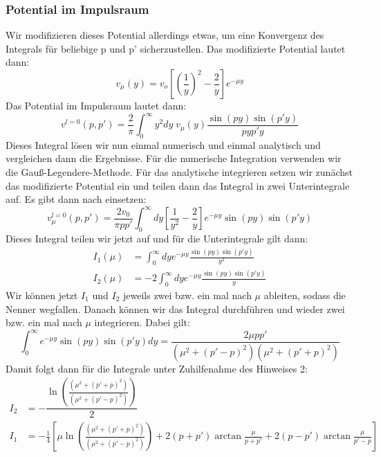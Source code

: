 \documentclass[11pt,a4paper]{article}
\begin{document}
\subsubsection*{Potential im Impulsraum}
Wir modifizieren dieses Potential allerdings etwas, um eine Konvergenz des Integrals für beliebige p und p' sicherzustellen. Das modifizierte Potential lautet dann:
\begin{equation}
	v_{\mu}(y) = v_o\left[\left(\frac{1}{y}\right)^2 -\frac{2}{y}\right]e^{-\mu y}
\end{equation}
Das Potential im Impulsraum lautet dann:
\begin{equation}\label{eq:pot_impuls}
	v^{l=0}(p,p') = \frac{2}{\pi}\int_{0}^{\infty}y^2dy\; v_{\mu}(y)\frac{\sin(py)\sin(p'y)}{pyp'y}
\end{equation}
Dieses Integral lösen wir nun einmal numerisch und einmal analytisch und vergleichen dann die Ergebnisse. Für die numerische Integration verwenden wir die Gauß-Legendere-Methode. Für das analytische integrieren setzen wir zunächst das modifizierte Potential ein und teilen dann das Integral in zwei Unterintegrale auf. Es gibt dann nach einsetzen:
\begin{equation}
	v_{\mu}^{l=0}(p,p') = \frac{2v_0}{\pi pp'}\int_{0}^{\infty}dy \left[\frac{1}{y^2}-\frac{2}{y}\right]e^{-\mu y}\sin(py)\sin(p'y)
\end{equation}
Dieses Integral teilen wir jetzt auf und für die Unterintegrale gilt dann:
\begin{align*}
	I_1(\mu) &= \int_{0}^{\infty}dye^{-\mu y}\frac{\sin(py)\sin(p'y)}{y^2} \\
	I_2(\mu) &= -2\int_{0}^{\infty}dye^{-\mu y}\frac{\sin(py)\sin(p'y)}{y}
\end{align*}
Wir können jetzt $I_1$ und $I_2$ jeweils zwei bzw. ein mal nach $\mu$ ableiten, sodass die Nenner wegfallen. Danach können wir das Integral durchführen und wieder zwei bzw. ein mal nach $\mu$ integrieren.
Dabei gilt:
\begin{equation*}
	\int_{0}^{\infty}e^{-\mu y}\sin(py)\sin(p'y)dy = \frac{2\mu pp'}{(\mu^2+(p'-p)^2)(\mu^2+(p'+p)^2)}
\end{equation*}
Damit folgt dann für die Integrale unter Zuhilfenahme des Hinweises 2:
\begin{align}
	I_2 &= -\dfrac{\ln(\frac{(\mu^2+(p'+p)^2)}{(\mu^2+(p'-p)^2)})}{2} \\
	I_1 &= -\frac{1}{4}\left[\mu\ln(\frac{(\mu^2+(p'+p)^2)}{(\mu^2+(p'-p)^2)}) +2(p+p')\arctan\frac{\mu}{p+p'} +2(p-p')\arctan\frac{\mu}{p'-p}\right]
\end{align}
\end{document}
